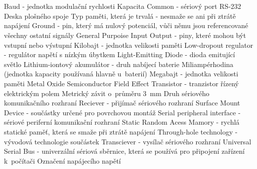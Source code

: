 \cleardoublepage
\chapter*{\listofabbrevname}
{}

\begin{acronym}[KolikMista]
		{Baud - jednotka modulační rychlosti}
		{Kapacita}
		{Common - sériový port RS-232}
		{Deska plošného spoje}
		{Typ paměti, která je trvalá - nesmaže se ani při ztrátě napájení}
		{Ground - pin, který má nulový potenciál, vůči němu jsou referencované všechny ostatní signály}
		{General Purpoise Input Output - piny, které mohou být vstupní nebo výstupní}
		{Kilobajt - jednotka velikosti paměti}
		{Low-dropout regulator - regulátor napětí s nízkým úbytkem}
		{Light-Emitting Diode - dioda emitující světlo}
		{Lithium-iontový akumulátor - druh nabíjecí baterie}
		{Miliampérhodina (jednotka kapacity používaná hlavně u~baterií)}
		{Megabajt - jednotka velikosti paměti}
		{Metal Oxide Semiconductor Field Effect Transistor - tranzistor řízený elektrickým polem}	
		{Metrický závit o~průměru 3~mm}
		{Druh sériového komunikačního rozhraní} 
		{Reciever - přijímač sériového rozhraní}
		{Surface Mount Device - součástky určené pro povrchovou montáž} 
		{Serial peripheral interface - sériové periferní komunikační rozhraní}
		{Static Random Acess Mamory - rychlá statické paměť, která se smaže při ztrátě napájení}	
		{Through-hole technology - vývodová technologie součástek}
		{Transciever - vysílač sériového rozhraní} 
		{Universal Serial Bus - univerzální sériová sběrnice, která se používá pro připojení zařízení k~počítači}
		{Označení napájecího napětí}

\end{acronym}
